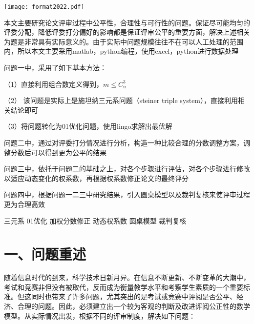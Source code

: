 \documentclass{my_paper}
\begin{document}
	\begin{table}
		\centering
		\texttt{[image: format2022.pdf]}
	\end{table}
	\newpage
	
	\begin{center}
		\lunwenbiaoti
		
		\vspace{2ex}
		\zhaiyao
	\end{center}
	
	本文主要研究论文评审过程中公平性，合理性与可行性的问题。保证尽可能均匀的评委分配，降低评委打分偏好的影响都是保证评审公平的重要方面，解决上述相关为题是非常具有实际意义的。由于实际中问题规模往往不在可以人工处理的范围内，所以本文主要采用matlab，python编程，使用excel，python进行数据处理
	
	问题一中，采用了如下基本方法：
	
	（1）直接利用组合数定义得到，$m \leq C_n^3$
	
	（2） 该问题是实际上是施坦纳三元系问题（steiner triple system），直接利用相关结论即可
	
	（3）将问题转化为01优化问题，使用lingo求解出最优解
	
	问题二中，通过对评委打分情况进行分析，构造一种比较合理的分数调整方案，调整分数后可以得到更为公平的结果
	
	问题三中，依托于问题二的基础之上，对各个步骤进行评估，对各个步骤进行修改以适应动态变化的权系数，再根据权系数修正论文的最终评分
	
	问题四中，根据问题一二三中研究结果，引入圆桌模型以及裁判复核来使评审过程更为合理高效
	
	
	
	
	\begin{guanjianci}
		三元系 \quad 01优化 \quad 加权分数修正 \quad 动态权系数 \quad 圆桌模型 \quad 裁判复核 
	\end{guanjianci}
	
	\newpage
	\section{一、问题重述}
	随着信息时代的到来，科学技术日新月异。在信息不断更新、不断变革的大潮中，考试和竞赛非但没有被取代，反而成为衡量教学水平和考察学生素质的一个重要标准。但这同时也带来了许多问题，尤其突出的是考试或竞赛中评阅是否公平、经济、合理的问题。因此，必须建立出一个较为客观的判断及改进评阅公正性的数学模型。从实际情况出发，根据不同的评审制度，解决如下问题：
	
\end{document}
